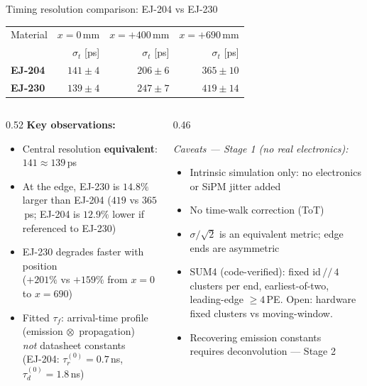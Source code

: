 \documentclass[aspectratio=169,9pt]{beamer}
\begin{document}
\begin{frame}{Timing resolution comparison: EJ-204 vs EJ-230}
  \begin{center}
    \large
    \begin{tabular}{lrrr}
      \toprule
      Material & $x=0$\,mm & $x=+400$\,mm & $x=+690$\,mm \\
               & $\sigma_t$ [ps] & $\sigma_t$ [ps] & $\sigma_t$ [ps] \\
      \midrule
      \textcolor{ej204col}{\textbf{EJ-204}} & $141\pm4$ & $206\pm6$ & $365\pm10$ \\
      \textcolor{ej230col}{\textbf{EJ-230}} & $139\pm4$ & $247\pm7$ & $419\pm14$ \\
      \bottomrule
    \end{tabular}
  \end{center}
  \vspace{0.4em}
  \begin{columns}[T]
    \begin{column}{0.52\textwidth}
      \textbf{Key observations:}
      \begin{itemize}
        \item Central resolution \textbf{equivalent}: $141\approx139$\,ps
        \item At the edge, EJ-230 is $14.8\%$ larger than EJ-204
              ($419$ vs $365$\,ps; EJ-204 is $12.9\%$ lower if referenced to EJ-230)
        \item EJ-230 degrades faster with position\\
              ($+201\%$ vs $+159\%$ from $x=0$ to $x=690$)
        \item Fitted $\tau_f$: arrival-time profile (emission $\otimes$\ propagation)\\
              \textit{not} datasheet constants\\
              (EJ-204: $\tau_r^{(0)}=0.7$\,ns, $\tau_d^{(0)}=1.8$\,ns)
      \end{itemize}
    \end{column}
    \begin{column}{0.46\textwidth}
      {\small \color{gray}
      \textit{Caveats — Stage 1 (no real electronics):}
      \begin{itemize}
        \item Intrinsic simulation only: no electronics or SiPM jitter added
        \item No time-walk correction (ToT)
        \item $\sigma/\sqrt{2}$ is an equivalent metric; edge ends are asymmetric
        \item SUM4 (code-verified): fixed id$\,{/\!/}\,4$ clusters per end,
              earliest-of-two, leading-edge $\geq4$\,PE.
              Open: hardware fixed clusters vs moving-window.
        \item Recovering emission constants\\
              requires deconvolution — Stage 2
      \end{itemize}
      }
    \end{column}
  \end{columns}
\end{frame}
\end{document}
